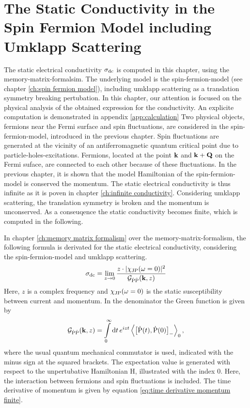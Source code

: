 %
%
%
\chapter{The Static Conductivity in the Spin Fermion Model including Umklapp Scattering}
\label{ch:calculation}
%
%
%
The static electrical conductivity $\sigma_{\mathrm{dc}}$ is computed in this chapter, using the memory-matrix-formalsim.
The underlying model is the spin-fermion-model (see chapter \ref{ch:spin fermion model}), including umklapp scattering as a translation symmetry breaking pertubation.
In this chapter, our attention is focused on the physical analysis of the obtained expression for the conductivity.
An explicite computation is demonstrated in appendix \ref{app:calculation}
%
%
%
%
Two physical objects, fermions near the Fermi surface and spin fluctuations, are considered in the spin-fermion-model, introduced in the previous chapter.
Spin fluctuations are generated at the vicinity of an antiferromagnetic quantum critical point due to particle-holes-excitations.
Fermions, located at the point $\vb{k}$ and $\vb{k}+\vb{Q}$ on the Fermi suface, are connected to each other because of these fluctuations.
In the previous chapter, it is shown that the model Hamiltonian of the spin-fermion-model is conserved the momentum.
The static electrical conductivity is thus infinite as it is poven in chapter \ref{ch:infinite conductivity}.
Considering umklapp scattering, the translation symmetry is broken and the momentum is unconserved.
As a conseuqence the static conductivity becomes finite, which is computed in the following.

In chapter \ref{ch:memory matrix formalism} over the memory-matrix-formalism, the following formula is derivated for the static electrical conductivity, considering the spin-fermion-model and umklapp scattering.
%
\begin{align}
	\sigma_{\mathrm{dc}} = \lim\limits_{z \to 0} \frac{z \cdot |\chi_{\mathrm{JP}}(\omega = 0)|^{2}}{\mathcal{G}_{\dot{\mathrm{P}}\dot{\mathrm{P}}}(\vb{k}, z)}
\end{align}
%
Here, $z$ is a complex frequency and $\chi_{\mathrm{JP}}(\omega = 0)$ is the static susceptibility between current and momentum.
In the denominator the Green function is given by
%
\begin{align}
	\mathcal{G}_{\dot{\mt{P}}\dot{\mt{P}}}(\vb{k}, z) = \int\limits_{0}^{\infty} \dd{t} e^{izt} \expval{\comm{\dot{\mt{P}}(t)}{\dot{\mt{P}}(0)}_{-}}_{0},
\end{align}
%
where the usual quantum mechanical commutator is used, indicated with the minus sign at the squared brackets.
The expectation value is generated with respect to the unpertubative Hamiltonian H, illustrated with the index 0.
Here, the interaction between fermions and spin fluctuations is included.
The time derivative of momentum is given by equation \eqref{eq:time derivative momentum finite}.

